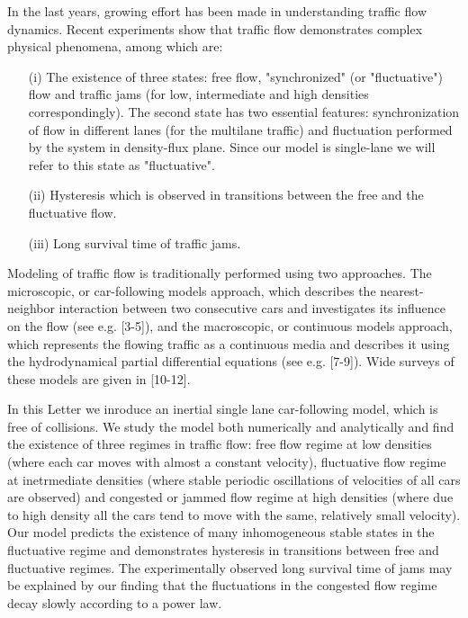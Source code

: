 In the last years, growing effort has been made in understanding
traffic flow dynamics. Recent experiments \cite{KR1,KR2} show that
traffic flow demonstrates complex physical phenomena, among which
are:
\begin{itemize}
\item[(i)] The existence of three states: free flow, "synchronized" (or
"fluctuative") flow and traffic jams (for low, intermediate and high
densities correspondingly).
The second state has two essential features: synchronization of flow in
different lanes (for the multilane traffic) and fluctuation performed by the
system in density-flux plane. Since our model is single-lane we will refer to
this state as "fluctuative".
\item[(ii)] Hysteresis which is observed in transitions between the free and
the fluctuative flow.
\item[(iii)] Long survival time of traffic jams.
\end{itemize}
Modeling of traffic flow is traditionally performed using two approaches.
The microscopic, or car-following models approach, which describes the nearest-neighbor interaction
between two consecutive cars and investigates its influence on the
flow (see e.g. [3-5]), and the macroscopic, or
continuous models approach, which represents the flowing traffic as a
continuous media and describes it using the hydrodynamical partial
differential equations (see e.g. [7-9]). Wide surveys of
these models are given in [10-12].

In this Letter we inroduce an inertial single lane car-following model, which
is free of collisions. We study the model both numerically and
analytically and find the existence of three regimes in traffic flow:
free flow regime at low densities (where each car moves with almost a constant
velocity), fluctuative flow regime at inetrmediate densities (where stable
periodic oscillations of velocities of all cars are observed) and congested or
jammed flow regime at high densities (where due to high density all the cars
tend to move with the same, relatively small velocity). Our model predicts the
existence of many inhomogeneous stable states in the fluctuative regime and
demonstrates hysteresis in transitions between free and fluctuative
regimes. The experimentally observed long survival time of jams may be
explained by our finding that the fluctuations in the congested flow regime
decay slowly according to a power law.

